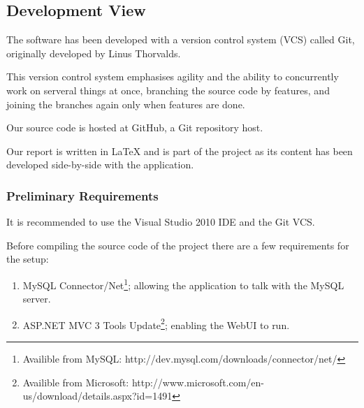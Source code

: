\subsection{Development View}

The software has been developed with a version control system (VCS) called Git\cite{progit},
originally developed by Linus Thorvalds.

This version control system emphasises agility and the ability to concurrently work on serveral
things at once, branching the source code by features, and joining the branches again only when
features are done\cite{sopBranching}.

Our source code is hosted at GitHub, a Git repository host.

Our report is written in \LaTeX\cite{latexBook} and is part of the project as its content has been developed
side-by-side with the application.

\subsubsection{Preliminary Requirements}

It is recommended to use the Visual Studio 2010 IDE and the Git VCS.

Before compiling the source code of the project there are a few requirements for the setup:

\begin{enumerate}
    \item MySQL Connector/Net\footnote{Availible from MySQL: http://dev.mysql.com/downloads/connector/net/};
        allowing the application to talk with the MySQL server.
    \item ASP.NET MVC 3 Tools Update\footnote{Availible from Microsoft: http://www.microsoft.com/en-us/download/details.aspx?id=1491};
        enabling the WebUI to run.
\end{enumerate}